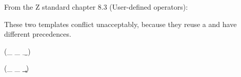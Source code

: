 From the Z standard chapter 8.3 (User-defined operators):

These two templates conflict unacceptably, because they
reuse a and have different precedences.


\begin{zed}
 \leftassoc (\_ \a \_ \b \_)
\end{zed}

\begin{zed}
 \leftassoc (\_ \a \_ \c \_)
\end{zed}
